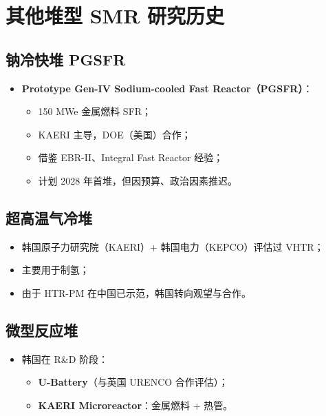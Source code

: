 \documentclass[
  UTF8,
  scheme=plain,
  fontsize=10pt,
  openany
]{ctexbook}
\begin{document}
\section{其他堆型 SMR
研究历史}\label{ux5176ux4ed6ux5806ux578b-smr-ux7814ux7a76ux5386ux53f2}

\subsection{钠冷快堆 PGSFR}\label{ux94a0ux51b7ux5febux5806-pgsfr}

\begin{itemize}
\tightlist
\item
  \textbf{Prototype Gen-IV Sodium-cooled Fast Reactor（PGSFR）}：

  \begin{itemize}
  \tightlist
  \item
    150 MWe 金属燃料 SFR；
  \item
    KAERI 主导，DOE（美国）合作；
  \item
    借鉴 EBR-II、Integral Fast Reactor 经验；
  \item
    计划 2028 年首堆，但因预算、政治因素推迟。
  \end{itemize}
\end{itemize}

\subsection{超高温气冷堆}\label{ux8d85ux9ad8ux6e29ux6c14ux51b7ux5806}

\begin{itemize}
\tightlist
\item
  韩国原子力研究院（KAERI）+ 韩国电力（KEPCO）评估过 VHTR；
\item
  主要用于制氢；
\item
  由于 HTR-PM 在中国已示范，韩国转向观望与合作。
\end{itemize}

\subsection{微型反应堆}\label{ux5faeux578bux53cdux5e94ux5806-1}

\begin{itemize}
\tightlist
\item
  韩国在 R\&D 阶段：

  \begin{itemize}
  \tightlist
  \item
    \textbf{U-Battery}（与英国 URENCO 合作评估）；
  \item
    \textbf{KAERI Microreactor}：金属燃料 + 热管。
  \end{itemize}
\end{itemize}
\end{document}
